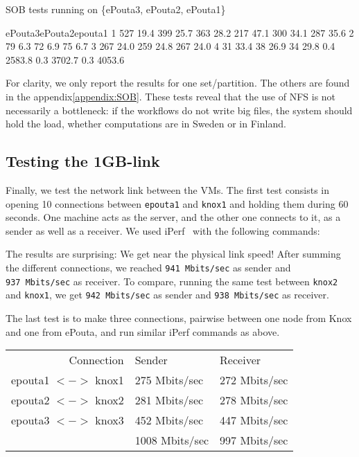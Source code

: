 \begin{table}[ht]%
\caption{SOB tests running on \{ePouta3, ePouta2, ePouta1\}}
\label{experiments:SOB:tests}
\resultpartition%
{{ePouta3}{ePouta2}{epouta1}}%
{{ 1 }{ 527 }{ 19.4   }{ 399 }{ 25.7   }{ 363 }{ 28.2   }{      }}%
{{   }{ 217 }{ 47.1   }{ 300 }{ 34.1   }{ 287 }{ 35.6   }{\hline}}%
{{ 2 }{  79 }{ 6.3    }{  72 }{ 6.9    }{  75 }{ 6.7    }{\hline}}%
{{ 3 }{ 267 }{ 24.0   }{ 259 }{ 24.8   }{ 267 }{ 24.0   }{\hline}}%
{{ 4 }{  31 }{ 33.4   }{  38 }{ 26.9   }{  34 }{ 29.8   }{      }}%
{{   }{ 0.4 }{ 2583.8 }{ 0.3 }{ 3702.7 }{ 0.3 }{ 4053.6 }{      }}
\end{table}

For clarity, we only report the results for one set/partition. The
others are found in the appendix\ref{appendix:SOB}. These tests reveal
that the use of NFS is not necessarily a bottleneck: if the workflows
do not write big files, the system should hold the load, whether
computations are in Sweden or in Finland.

\subsection{Testing the 1GB-link}
\label{section:experiments:link}

Finally, we test the network link between the VMs.
%
The first test consists in opening 10 connections between
\texttt{epouta1} and \texttt{knox1} and holding them during 60
seconds.  One machine acts as the server, and the other one connects
to it, as a sender as well as a receiver. We used iPerf~\cite{iperf}
with the following commands:


The results are surprising: We get near the physical link speed! After
summing the different connections, we reached \texttt{941\ Mbits/sec} as
sender and \texttt{937\ Mbits/sec} as receiver. To compare, running the
same test between \texttt{knox2} and \texttt{knox1}, we get
\texttt{942\ Mbits/sec} as sender and \texttt{938\ Mbits/sec} as
receiver.

The last test is to make three connections, pairwise between one node
from Knox and one from ePouta, and run similar iPerf commands as
above.

\begin{center}
\begin{tabular}{|r||l|l|}\hhline{*{3}{=}}
Connection          & Sender         & Receiver\\\hhline{*{3}{=}}
epouta1 $<->$ knox1 & 275 Mbits/sec  & 272 Mbits/sec\\
epouta2 $<->$ knox2 & 281 Mbits/sec  & 278 Mbits/sec\\
epouta3 $<->$ knox3 & 452 Mbits/sec  & 447 Mbits/sec\\\hhline{*{3}{=}}
\multicolumn{1}{r}{Total} & \multicolumn{1}{l}{1008 Mbits/sec} & \multicolumn{1}{l}{997 Mbits/sec}\\
\end{tabular}
\end{center}

